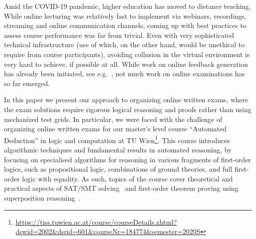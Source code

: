 Amid the COVID-19 pandemic, higher education has moved to distance
teaching. While online lecturing was relatively fast to implement via
webinars, recordings,  streaming and online communication channels,
coming up with best practices to assess course performance was far
from trivial. Even with very sophisticated technical infrastructure
(use of which, on the other hand, would be unethical to require from course
participants), avoiding collusion in the virtual
environment is very hard to achieve, if possible at all.
While work on
online feedback generation has already been initiated, see
e.g.~\cite{Zuleger18,Wang18}, 
not much work on online examinations has so far emerged. 

In this paper we present our approach to organizing online
written exams, where the exam solutions require rigorous
logical reasoning and proofs rather than using mechanized test grids.
In particular, we were faced with the challenge of organizing online
written exams for our master's level course ``Automated
Deduction'' in logic and computation at TU
Wien\footnote{\url{https://tiss.tuwien.ac.at/course/courseDetails.xhtml?dswid=2002\&dsrid=601\&courseNr=184774\&semester=2020S}}.
This course introduces algorithmic techniques and fundamental results
in automated reasoning, by focusing on specialised algorithms for
reasoning in various fragments of first-order logics, such as
propositional logic, combinations of ground theories, and full
first-order logic with equality.
As such, topics of the course cover theoretical and practical
aspects of SAT/SMT solving~\cite{DPLL,Tinelli02,DPLLT} and first-order theorem proving using
superposition reasoning~\cite{Rubio01,Vampire13}.

